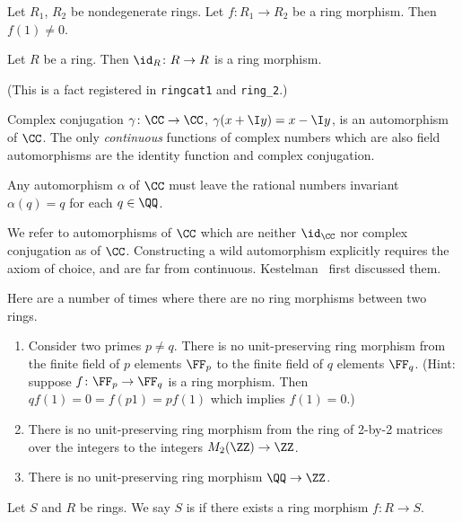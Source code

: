 \begin{theorem}
Let $R_{1}$, $R_{2}$ be nondegenerate rings.
Let $f\colon R_{1}\to R_{2}$ be a ring morphism.
Then $f(1)\neq0$.
\end{theorem}

\begin{example}%
Let $R$ be a ring. Then $\id_{R}\colon R\to R$ is a ring morphism.
\end{example}

(This is a fact registered in \texttt{ringcat1} and \texttt{ring\_2}.)

\begin{example}
Complex conjugation $\gamma\colon\CC\to\CC$, $\gamma(x+\I y)=x-\I y$,
is an automorphism of $\CC$. The only \emph{continuous} functions of
complex numbers which are also field automorphisms are the identity
function and complex conjugation.

Any automorphism $\alpha$ of $\CC$ must leave the rational numbers
invariant $\alpha(q)=q$ for each $q\in\QQ$.

We refer to automorphisms of $\CC$ which are neither $\id_{\CC}$ nor
complex conjugation as  of $\CC$.
Constructing a wild automorphism explicitly requires the axiom of choice,
and are far from continuous. Kestelman~\cite{kestelman1951automorphisms}
first discussed them.
\end{example}

\begin{example}
Here are a number of times where there are no ring morphisms between
two rings.
\begin{enumerate}
\item Consider two primes $p\neq q$. There is no unit-preserving ring
morphism from the finite field of $p$ elements $\FF_{p}$ to the finite
field of $q$ elements $\FF_{q}$. (Hint: suppose
$f\colon\FF_{p}\to\FF_{q}$ is a ring morphism. Then
$qf(1)=0=f(p1)=pf(1)$ which implies $f(1)=0$.)
\item  There is no unit-preserving ring morphism from the ring of 2-by-2
matrices over the integers to the integers $M_{2}(\ZZ)\to\ZZ$.
\item There is no unit-preserving ring morphism $\QQ\to\ZZ$.
\end{enumerate}
\end{example}

\begin{definition}
Let $S$ and $R$ be rings.
We say $S$ is  if there exists a ring morphism
$f\colon R\to S$.
\end{definition}

